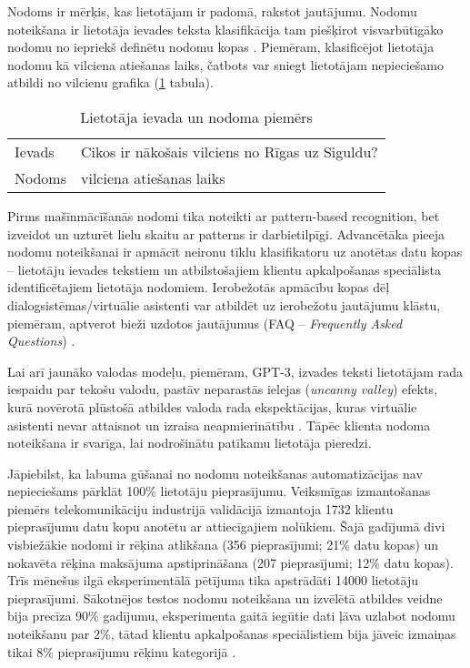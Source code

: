 Nodoms ir mērķis, kas lietotājam ir padomā, rakstot jautājumu. Nodomu noteikšana ir lietotāja ievades teksta klasifikācija tam piešķirot visvarbūtīgāko nodomu no iepriekš definētu nodomu kopas \cite{fasttext2019}. Piemēram, klasificējot lietotāja nodomu kā vilciena atiešanas laiks, čatbots var sniegt lietotājam nepieciešamo atbildi no vilcienu grafika (\ref{tab:input-intent} tabula).


\begin{table}[htbp]
	\centering
	\caption{Lietotāja ievada un nodoma piemērs}
	\begin{tabular}{ll}\toprule
		Ievads & Cikos ir nākošais vilciens no Rīgas uz Siguldu? \\
		Nodoms & vilciena atiešanas laiks \\\bottomrule
	\end{tabular}%
	\label{tab:input-intent}%
\end{table}

Pirms mašīnmācīšanās nodomi tika noteikti ar pattern-based recognition, bet izveidot un uzturēt lielu skaitu ar patterns ir darbietilpīgi. Advancētāka pieeja nodomu noteikšanai ir apmācīt neironu tīklu klasifikatoru uz anotētas datu kopas -- lietotāju ievades tekstiem un atbilstošajiem klientu apkalpošanas speciālista identificētajiem lietotāja nodomiem. Ierobežotās apmācību kopas dēļ dialogsistēmas/virtuālie asistenti var atbildēt uz ierobežotu jautājumu klāstu, piemēram, aptverot bieži uzdotos jautājumus (FAQ -- \textit{Frequently Asked Questions}) \cite{fasttext2019}.

Lai arī jaunāko valodas modeļu, piemēram, GPT-3, izvades teksti lietotājam rada iespaidu par tekošu valodu, pastāv neparastās ielejas (\textit{uncanny valley}) efekts, kurā novērotā plūstošā atbildes valoda rada ekspektācijas, kuras virtuālie asistenti nevar attaisnot un izraisa neapmierinātību \cite{paikens2020}. Tāpēc klienta nodoma noteikšana ir svarīga, lai nodrošinātu patīkamu lietotāja pieredzi.

Jāpiebilst, ka labuma gūšanai no nodomu noteikšanas automatizācijas nav nepieciešams pārklāt 100\% lietotāju pieprasījumu. Veiksmīgas izmantošanas piemērs telekomunikāciju industrijā validācijā izmantoja 1732 klientu pieprasījumu datu kopu anotētu ar attiecīgajiem nolūkiem. Šajā gadījumā divi visbiežākie nodomi ir rēķina atlikšana (356 pieprasījumi; 21\% datu kopas) un nokavēta rēķina maksājuma apstiprināšana (207 pieprasījumi; 12\% datu kopas). Trīs mēnešus ilgā eksperimentālā pētījuma tika apstrādāti 14000 lietotāju pieprasījumi. Sākotnējos testos nodomu noteikšana un izvēlētā atbildes veidne bija precīza 90\% gadījumu, eksperimenta gaitā iegūtie dati ļāva uzlabot nodomu noteikšanu par 2\%, tātad klientu apkalpošanas speciālistiem bija jāveic izmaiņas tikai 8\% pieprasījumu rēķinu kategorijā \cite{paikens2020}.

